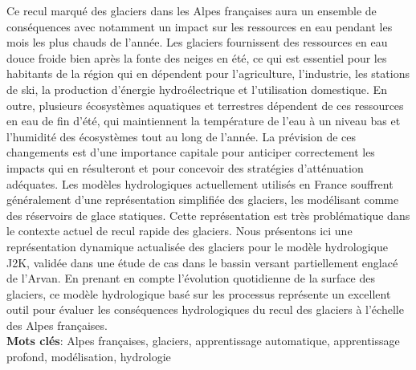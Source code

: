 Ce recul marqué des glaciers dans les Alpes françaises aura un ensemble de conséquences avec notamment un impact sur les ressources en eau pendant les mois les plus chauds de l'année. Les glaciers fournissent des ressources en eau douce froide bien après la fonte des neiges en été, ce qui est essentiel pour les habitants de la région qui en dépendent pour l'agriculture, l'industrie, les stations de ski, la production d'énergie hydroélectrique et l'utilisation domestique. En outre, plusieurs écosystèmes aquatiques et terrestres dépendent de ces ressources en eau de fin d'été, qui maintiennent la température de l'eau à un niveau bas et l'humidité des écosystèmes tout au long de l'année. La prévision de ces changements est d'une importance capitale pour anticiper correctement les impacts qui en résulteront et pour concevoir des stratégies d'atténuation adéquates. Les modèles hydrologiques actuellement utilisés en France souffrent généralement d'une représentation simplifiée des glaciers, les modélisant comme des réservoirs de glace statiques. Cette représentation est très problématique dans le contexte actuel de recul rapide des glaciers. Nous présentons ici une représentation dynamique actualisée des glaciers pour le modèle hydrologique J2K, validée dans une étude de cas dans le bassin versant partiellement englacé de l'Arvan. En prenant en compte l'évolution quotidienne de la surface des glaciers, ce modèle hydrologique basé sur les processus représente un excellent outil pour évaluer les conséquences hydrologiques du recul des glaciers à l'échelle des Alpes françaises. \\

\textbf{Mots clés}: Alpes françaises, glaciers, apprentissage automatique, apprentissage profond, modélisation, hydrologie